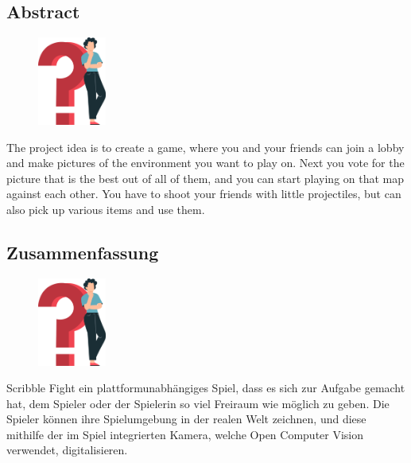 \begin{spacing}{1}
  \chapter*{Abstract}
\end{spacing}
\begin{figure}
  \begin{center}
    \includegraphics[width=0.2\textwidth]{pics/question_mark.png}
  \end{center}
\end{figure}
The project idea is to create a game, where you and your friends can join a lobby and make pictures of the environment you want to play on.
Next you vote for the picture that is the best out of all of them, and you can start playing on that map against each other. You have to shoot your friends with little projectiles, but can also pick up various items and use them.
\lipsum[6]
\newpage
\begin{spacing}{1}
  \chapter*{Zusammenfassung}
\end{spacing}
\begin{figure}
  \begin{center}
    \includegraphics[width=0.2\textwidth]{pics/question_mark.png}
  \end{center}
\end{figure}
Scribble Fight ein plattformunabhängiges Spiel, dass es sich zur Aufgabe gemacht hat, dem Spieler oder der Spielerin so viel Freiraum wie möglich zu geben. 
Die Spieler können ihre Spielumgebung in der realen Welt zeichnen, und diese mithilfe der im Spiel integrierten Kamera, welche Open Computer Vision verwendet, digitalisieren.
